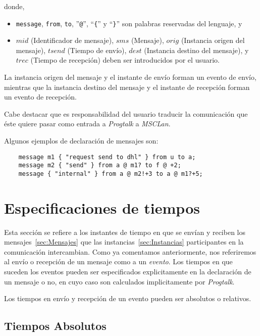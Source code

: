 donde,
\begin{itemize}
\item \lstinline{message}, \lstinline{from}, \lstinline{to},
  ''\lstinline{@}'', ``\lstinline!{!'' y ``\lstinline!}!'' son
  palabras reservadas del lenguaje, y
\item $mid$ (Identificador de mensaje), $sms$ (Mensaje), $orig$
  (Instancia origen del mensaje), $tsend$ (Tiempo de envío), $dest$
  (Instancia destino del mensaje), y $trec$ (Tiempo de recepción)
  deben ser introducidos por el usuario.
\end{itemize}

La instancia origen del mensaje y el instante de envío forman un
evento de envío, mientras que la instancia destino del mensaje y el
instante de recepción forman un evento de recepción.

Cabe destacar que es responsabilidad del usuario traducir la
comunicación que éste quiere pasar como entrada a \textit{Progtalk} a
\textit{MSCLan}.

Algunos ejemplos de declaración de mensajes son:

\begin{lstlisting}
    message m1 { "request send to dhl" } from u to a;
    message m2 { "send" } from a @ m1? to f @ +2;
    message { "internal" } from a @ m2!+3 to a @ m1?+5;
\end{lstlisting}

\section{Especificaciones de tiempos}
\label{sec:Tiempos}

Esta sección se refiere a los instantes de tiempo en que se envían y
reciben los mensajes~\ref{sec:Mensajes} que las
instancias~\ref{sec:Instancias} participantes en la
comunicación intercambian. Como ya comentamos anteriormente, nos
referiremos al envío o recepción de un mensaje como a un
\textit{evento}. Los tiempos en que suceden los eventos pueden ser
especificados explicitamente en la declaración de un mensaje o no, en
cuyo caso son calculados implicitamente por \textit{Progtalk}.

Los tiempos en envío y recepción de un evento pueden ser absolutos o
relativos.

\subsection{Tiempos Absolutos}

